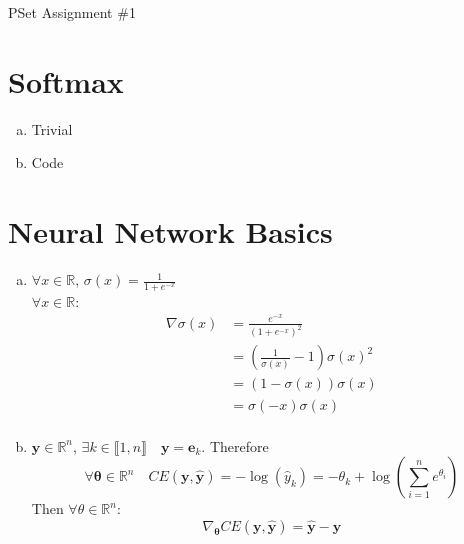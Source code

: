 \documentclass[19pt]{extarticle}
\begin{document}
\begin{center}
\huge{PSet Assignment \#1}
\end{center}


\section{Softmax}
\begin{enumerate}[a)]
\item Trivial
\item Code
\end{enumerate}


\section{Neural Network Basics}
\begin{enumerate}[a)]
\item $\forall x \in \mathds{R}\text{, }\sigma(x) = \frac{1}{1 + e^{-x}} $\\
 $\forall x \in \mathds{R}:$
\begin{equation*}\begin{split}
\nabla\sigma(x) &= \frac{e^{-x}}{(1 + e^{-x})^2}\\
&= (\frac{1}{\sigma(x)}-1)\sigma(x)^2\\
&= (1-\sigma(x))\sigma(x)\\
&= \sigma(-x)\sigma(x)\\
\end{split}\end{equation*}


\item $\bm{y} \in \mathds{R}^n$, $\exists k \in \llbracket1,n \rrbracket \quad \bm{y} = \bm{e}_{k}$. Therefore 
$$\forall \bm{\theta} \in  \mathds{R}^n \quad CE(\bm{y},\hat{\bm{y}})= -\log(\hat{y}_k) = - \theta_k + \log(\sum_{i =1}^ne^{\theta_i})$$
Then $\forall \theta \in \mathds{R}^n :$ $$\nabla_{\bm{\theta}} CE (\bm{y},\hat{\bm{y}}) = \hat{\bm{y}} - \bm{y}$$




\end{enumerate}
\end{document}
